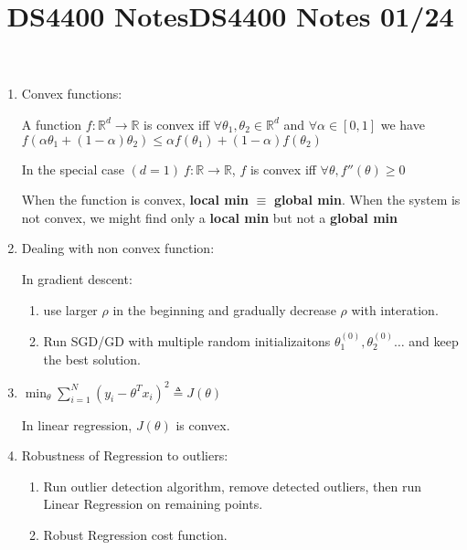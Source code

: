 \documentclass[12pt]{article}
\title{DS4400 Notes}
\date{}
\author{}
\begin{document}
    \maketitle

    \begin{multicols}{2}
        \title{DS4400 Notes 01/24}
        \maketitle
        \begin{enumerate}
            \item Convex functions:
            
            A function $f:\mathbb{R}^d \rightarrow \mathbb{R}$ is convex iff $\forall \theta_1, \theta_2 \in \mathbb{R}^d $ and $\forall \alpha \in [0,1]$ we have 
            $f(\alpha\theta_1 + (1-\alpha)\theta_2) \le \alpha f(\theta_1) + (1-\alpha)f(\theta_2)$
    
            In the special case $(d=1) \ f:\mathbb{R}\rightarrow \mathbb{{R}}$, $f$ is convex iff $\forall \theta, f''(\theta) \ge 0$

            When the function is convex, \textbf{local min} $\equiv$ \textbf{global min}. When the system is not convex, we might find only a \textbf{local min} but not a \textbf{global min}

            \item Dealing with non convex function:
            
            In gradient descent: 
            \begin{enumerate}
                \item use larger $\rho$ in the beginning and gradually decrease $\rho$ with interation.
                \item Run SGD/GD with multiple random initializaitons $\theta_1^{(0)}, \theta_2^{(0)} \dots $ and keep the best solution.
            \end{enumerate}

            \item $\min_{\theta} \sum_{i = 1}^N (y_i - \theta^Tx_i)^2 \triangleq J(\theta)$ 
            
            In linear regression, $J(\theta)$ is convex.

            \item Robustness of Regression to outliers:
            
            \begin{enumerate}
                \item Run outlier detection algorithm, remove detected outliers, then run Linear Regression on remaining points.
                \item Robust Regression cost function.
                

\end{enumerate}
\end{enumerate}
\end{multicols}
\end{document}
